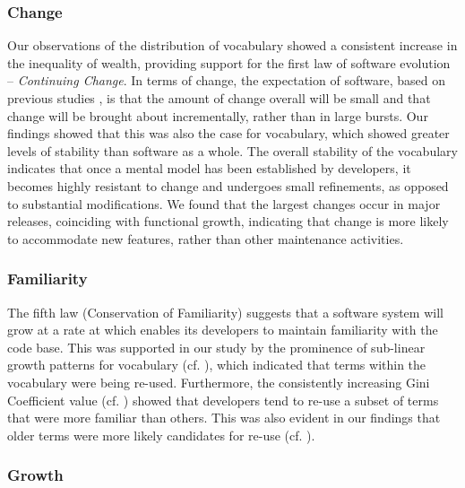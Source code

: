 \subsubsection{Change} %
\label{ssub:change}

Our observations of the distribution of vocabulary showed a consistent increase in the inequality of wealth, providing support for the first law of software evolution -- \emph{Continuing Change}. In terms of change, the expectation of software, based on previous studies \cite{Schneider03a, Vasa07a, Vasa07b}, is that the amount of change overall will be small and that change will be brought about incrementally, rather than in large bursts. Our findings showed that this was also the case for vocabulary, which showed greater levels of stability than software as a whole. The overall stability of the vocabulary indicates that once a mental model has been established by developers, it becomes highly resistant to change and undergoes small refinements, as opposed to substantial modifications. We found that the largest changes occur in major releases, coinciding with functional growth, indicating that change is more likely to accommodate new features, rather than other maintenance activities.


\subsubsection{Familiarity} %
\label{ssub:familiarity}

The fifth law (Conservation of Familiarity) suggests that a software system will grow at a rate at which enables its developers to maintain familiarity with the code base. This was supported in our study by the prominence of sub-linear growth patterns for vocabulary (cf. ), which indicated that terms within the vocabulary were being re-used. Furthermore, the consistently increasing Gini Coefficient value (cf. ) showed that developers tend to re-use a subset of terms that were more familiar than others. This was also evident in our findings that older terms were more likely candidates for re-use (cf. ).


\subsubsection{Growth} %
\label{ssub:growth}


